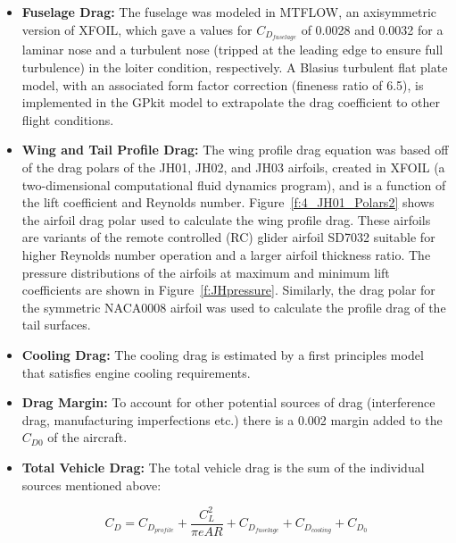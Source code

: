 \documentclass[journal]{aiaa-tc}%
\begin{document}
\begin{itemize}
    \item \textbf{Fuselage Drag:} 
    The fuselage was modeled in MTFLOW, an axisymmetric version of XFOIL, which gave a values for $C_{D_{fuselage}}$ of 0.0028 and 0.0032 for a laminar nose and a turbulent nose (tripped at the leading edge to ensure full turbulence) in the loiter condition, respectively. A Blasius turbulent flat plate model, with an associated form factor correction (fineness ratio of 6.5), is implemented in the GPkit model to extrapolate the drag coefficient to other flight conditions. 
    
    \item \textbf{Wing and Tail Profile Drag:}
    The wing profile drag equation was based off of the drag polars of the JH01, JH02, and JH03 airfoils, created in XFOIL\cite{XFOIL} (a two-dimensional computational fluid dynamics program), and is a function of the lift coefficient and Reynolds number. Figure~\ref{f:4_JH01_Polars2} shows the airfoil drag polar used to calculate the wing profile drag. These airfoils are variants of the remote controlled (RC) glider airfoil SD7032 suitable for higher Reynolds number operation and a larger airfoil thickness ratio. The pressure distributions of the airfoils at maximum and minimum lift coefficients are shown in Figure~\ref{f:JHpressure}. Similarly, the drag polar for the symmetric NACA0008 airfoil was used to calculate the profile drag of the tail surfaces. 
    
    \item \textbf{Cooling Drag: }
    The cooling drag is estimated by a first principles model that satisfies engine cooling requirements. 
    
    \item \textbf{Drag Margin:} 
    To account for other potential sources of drag (interference drag, manufacturing imperfections etc.) there is a 0.002 margin added to the $C_{D0}$ of the aircraft. 
    
    \item \textbf{Total Vehicle Drag:}
    The total vehicle drag is the sum of the individual sources mentioned above:
    
    \begin{equation}
            \label{e:totaldrag}
            C_D = C_{D_{profile}} + \frac{C_L^2}{\pi e AR} + C_{D_{fuselage}} + C_{D_{cooling}} + C_{D_{0}} 
    \end{equation}
\end{itemize}
\end{document}
